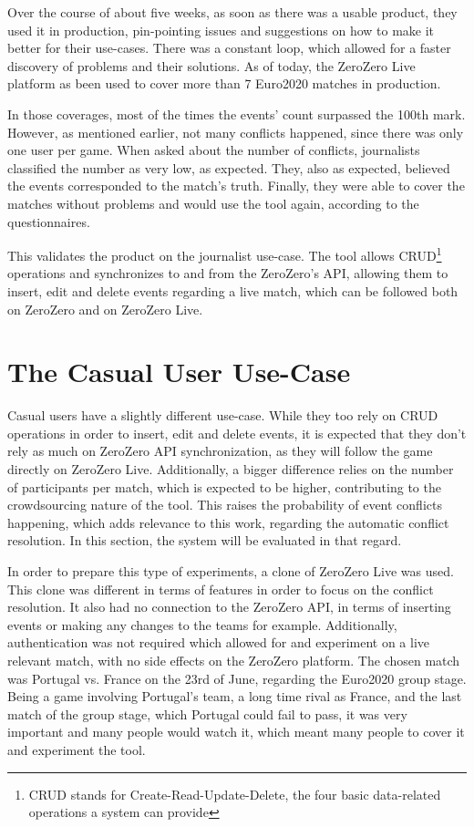 Over the course of about five weeks, as soon as there was a usable product, they used it in production, pin-pointing issues and suggestions on how to make it better for their use-cases. There was a constant  loop, which allowed for a faster discovery of problems and their solutions. As of today, the ZeroZero Live platform as been used to cover more than 7 Euro2020 matches in production.

In those coverages, most of the times the events' count surpassed the 100th mark. However, as mentioned earlier, not many conflicts happened, since there was only one user per game.
When asked about the number of conflicts, journalists classified the number as very low, as expected. They, also as expected, believed the events corresponded to the match's truth. Finally, they were able to cover the matches without problems and would use the tool again, according to the questionnaires.

This validates the product on the journalist use-case. The tool allows CRUD\footnote{CRUD stands for Create-Read-Update-Delete, the four basic data-related operations a system can provide} operations and synchronizes to and from the ZeroZero's API, allowing them to insert, edit and delete events regarding a live match, which can be followed both on ZeroZero and on ZeroZero Live.

\section{The Casual User Use-Case}

Casual users have a slightly different use-case. While they too rely on CRUD operations in order to insert, edit and delete events, it is expected that they don't rely as much on ZeroZero API synchronization, as they will follow the game directly on ZeroZero Live. Additionally, a bigger difference relies on the number of participants per match, which is expected to be higher, contributing to the crowdsourcing nature of the tool. This raises the probability of event conflicts happening, which adds relevance to this work, regarding the automatic conflict resolution. In this section, the system will be evaluated in that regard.

In order to prepare this type of experiments, a clone of ZeroZero Live was used. This clone was different in terms of features in order to focus on the conflict resolution. It also had no connection to the ZeroZero API, in terms of inserting events or making any changes to the teams for example. Additionally, authentication was not required which allowed for and experiment on a live relevant match, with no side effects on the ZeroZero platform. The chosen match was Portugal vs. France on the 23rd of June, regarding the Euro2020 group stage. Being a game involving Portugal's team, a long time rival as France, and the last match of the group stage, which Portugal could fail to pass, it was very important and many people would watch it, which meant many people to cover it and experiment the tool.

